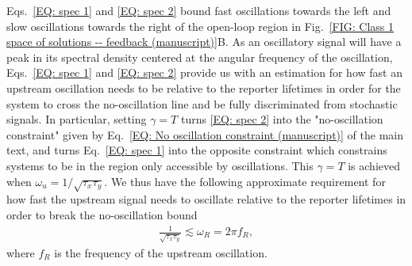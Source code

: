 \documentclass[%
 reprint,prx,
superscriptaddress,
%
%
%
%
%
%
%
%
%
 amsmath,amssymb,
 aps,
%
%
%
%
%
%
]{revtex4-2}
\begin{document}
Eqs.~\eqref{EQ: spec 1} and \eqref{EQ: spec 2} bound fast oscillations towards the left and slow oscillations towards the right of the open-loop region in Fig.~\ref{FIG: Class 1 space of solutions -- feedback (manuscript)}B. As an oscillatory signal will have a peak in its spectral density centered at the angular frequency of the oscillation, Eqs.~\eqref{EQ: spec 1} and \eqref{EQ: spec 2} provide us with an estimation for how fast an upstream oscillation needs to be relative to the reporter lifetimes in order for the system to cross the no-oscillation line and be fully discriminated from stochastic signals. In particular, setting $\gamma = T$ turns \eqref{EQ: spec 2} into the  "no-oscillation constraint" given by Eq.~\eqref{EQ: No oscillation constraint (manuscript)} of the main text, and turns Eq.~\eqref{EQ: spec 1} into the opposite constraint which constrains systems to be in the region only accessible by oscillations. This  $\gamma = T$ is achieved when $\omega_{u} = 1/\sqrt{\tau_{x}\tau_{y}}$. We thus have the following approximate requirement for how fast the upstream signal needs to oscillate relative to the reporter lifetimes in order to break the no-oscillation bound 
\begin{align}
 \frac{1}{\sqrt{\tau_{x}\tau_{y}}} \lesssim \omega_{R} = 2 \pi f_{R} ,
\end{align}
where $f_{R}$ is the frequency of the upstream oscillation. 
\end{document}
